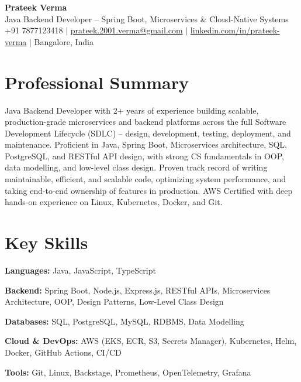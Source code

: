 \documentclass[letterpaper,10.5pt]{article}
\begin{document}
\begin{center}
  {\LARGE \textbf{Prateek Verma}} \\[4pt]
  \small Java Backend Developer -- Spring Boot, Microservices \& Cloud-Native Systems \\[4pt]
  +91 7877123418 \;$|$\;
  \href{mailto:prateek.2001.verma@gmail.com}{prateek.2001.verma@gmail.com} \;$|$\;
  \href{https://linkedin.com/in/prateek-verma-8125b3201}{linkedin.com/in/prateek-verma} \;$|$\;
  Bangalore, India
\end{center}

\section{Professional Summary}
\small{
Java Backend Developer with 2+ years of experience building scalable, production-grade microservices and backend platforms across the full Software Development Lifecycle (SDLC) -- design, development, testing, deployment, and maintenance. Proficient in Java, Spring Boot, Microservices architecture, SQL, PostgreSQL, and RESTful API design, with strong CS fundamentals in OOP, data modelling, and low-level class design. Proven track record of writing maintainable, efficient, and scalable code, optimizing system performance, and taking end-to-end ownership of features in production. AWS Certified with deep hands-on experience on Linux, Kubernetes, Docker, and Git.
}

\section{Key Skills}
\begin{itemize}[leftmargin=0.15in, label={}, itemsep=-1pt]
  \small{
    \item \textbf{Languages:} Java, JavaScript, TypeScript
    \item \textbf{Backend:} Spring Boot, Node.js, Express.js, RESTful APIs, Microservices Architecture, OOP, Design Patterns, Low-Level Class Design
    \item \textbf{Databases:} SQL, PostgreSQL, MySQL, RDBMS, Data Modelling
    \item \textbf{Cloud \& DevOps:} AWS (EKS, ECR, S3, Secrets Manager), Kubernetes, Helm, Docker, GitHub Actions, CI/CD
    \item \textbf{Tools:} Git, Linux, Backstage, Prometheus, OpenTelemetry, Grafana
  }
\end{itemize}
\end{document}
